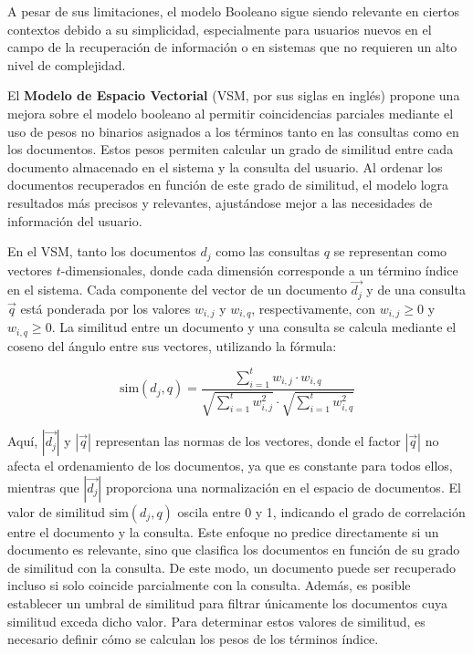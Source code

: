 A pesar de sus limitaciones, el modelo Booleano sigue siendo relevante en ciertos 
contextos debido a su simplicidad, especialmente para usuarios nuevos en el campo 
de la recuperación de información o en sistemas que no requieren un alto nivel de complejidad.

El \textbf{Modelo de Espacio Vectorial} (VSM, por sus siglas en inglés) propone 
una mejora sobre el modelo booleano al permitir coincidencias parciales mediante 
el uso de pesos no binarios asignados a los términos tanto en las consultas como 
en los documentos. Estos pesos permiten calcular un grado de similitud entre cada 
documento almacenado en el sistema y la consulta del usuario. Al ordenar los documentos 
recuperados en función de este grado de similitud, el modelo logra resultados más precisos 
y relevantes, ajustándose mejor a las necesidades de información del usuario.

En el VSM, tanto los documentos \( d_j \) como las consultas \( q \) se representan 
como vectores \( t \)-dimensionales, donde cada dimensión corresponde a un término 
índice en el sistema. Cada componente del vector de un documento \( \vec{d_j} \) y de 
una consulta \( \vec{q} \) está ponderada por los valores \( w_{i,j} \) y \( w_{i,q} \), 
respectivamente, con \( w_{i,j} \geq 0 \) y \( w_{i,q} \geq 0 \). La similitud entre un 
documento y una consulta se calcula mediante el coseno del ángulo entre sus vectores, 
utilizando la fórmula:

\[
\text{sim}(d_j, q) = \frac{\sum_{i=1}^t w_{i,j} \cdot w_{i,q}}{\sqrt{\sum_{i=1}^t w_{i,j}^2} \cdot \sqrt{\sum_{i=1}^t w_{i,q}^2}}
\]

Aquí, \( |\vec{d_j}| \) y \( |\vec{q}| \) representan las normas de los vectores, 
donde el factor \( |\vec{q}| \) no afecta el ordenamiento de los documentos, 
ya que es constante para todos ellos, mientras que \( |\vec{d_j}| \) proporciona 
una normalización en el espacio de documentos. El valor de similitud \( \text{sim}(d_j, q) \) 
oscila entre 0 y 1, indicando el grado de correlación entre el documento y la consulta. 
Este enfoque no predice directamente si un documento es relevante, sino que clasifica 
los documentos en función de su grado de similitud con la consulta. De este modo, 
un documento puede ser recuperado incluso si solo coincide parcialmente con la consulta. 
Además, es posible establecer un umbral de similitud para filtrar únicamente los documentos 
cuya similitud exceda dicho valor. Para determinar estos valores de similitud, 
es necesario definir cómo se calculan los pesos de los términos índice.

